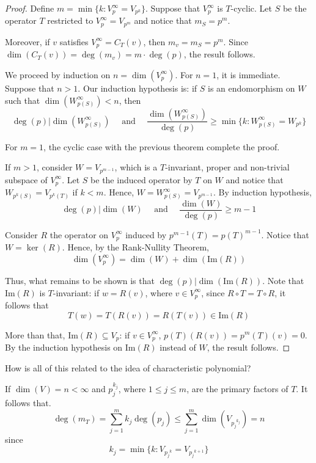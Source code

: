 \begin{proof}
	Define $m = \min \{ k : V_p^\infty = V_{p^k} \}$. Suppose that $V_p^\infty$ is $T$-cyclic. Let $S$ be the operator $T$ restricted to $V_p^\infty = V_{p^m}$ and notice that $m_S = p^m$.
	
	Moreover, if $v$ satisfies $V_p^\infty = C_T(v)$, then $m_v = m_S = p^m$. Since $\dim(C_T(v)) = \deg (m_v) = m \cdot \deg(p)$, the result follows.

	We proceed by induction on $n = \dim (V_p^\infty)$. For $n = 1$, it is immediate. Suppose that $n > 1$. Our induction hypothesis is: if $S$ is an endomorphism on $W$ such that $\dim (W_{p(S)}^\infty) < n$, then
	\[
		\deg(p) | \dim (W_{p(S)}^\infty) \quad \text{ and } \quad \frac{\dim (W_{p(S)}^\infty)}{\deg(p)} \geq \min \{ k : W_{p(S)}^\infty = W_{p^k} \}
	\]

	For $m = 1$, the cyclic case with the previous theorem complete the proof.
	
	If $m > 1$, consider $W = V_{p^{m-1}}$, which is a $T$-invariant, proper and non-trivial subspace of $V_p^\infty$. Let $S$ be the induced operator by $T$ on $W$ and notice that $W_{p^k(S)} = V_{p^k(T)}$ if $k < m$. Hence, $W = W_{p(S)}^\infty = V_{p^{m-1}}$. By induction hypothesis,
	\[
		\deg(p) | \dim(W) \quad \text{ and } \quad \frac{\dim(W)}{\deg(p)} \geq m-1
	\]
	
	Consider $R$ the operator on $V_p^\infty$ induced by $p^{m-1}(T) = p(T)^{m-1}$. Notice that $W = \ker(R)$. Hence, by the Rank-Nullity Theorem,
	\[
		\dim(V_p^\infty) = \dim(W) + \dim(\text{Im}(R))
	\]
	
	Thus, what remains to be shown is that $\deg(p) | \dim(\text{Im}(R))$. Note that $\text{Im}(R)$ is $T$-invariant: if $w = R(v)$, where $v \in V_p^\infty$, since $R \circ T = T \circ R$, it follows that 
	\[
		T(w) = T(R(v)) = R(T(v)) \in \text{Im}(R)
	\]
	
	More than that, $\text{Im}(R) \subseteq V_p$: if $v \in V_p^\infty$, $p(T)(R(v)) = p^m(T)(v) = 0$. By the induction hypothesis on $\text{Im}(R)$ instead of $W$, the result follows.
\end{proof}

How is all of this related to the idea of characteristic polynomial?

If $\dim(V) = n < \infty$ and $p_j^{k_j}$, where $1 \leq j \leq m$, are the primary factors of $T$. It follows that.
\[
	\deg (m_T) = \sum_{j=1}^m k_j \deg (p_j) \leq \sum_{j=1}^m \dim(V_{{p_j}^{k_j}}) = n
\]
since 
\[
	k_j = \min \{ k : V_{{p_j}^k} = V_{{p_j}^{k+1}} \}
\]

